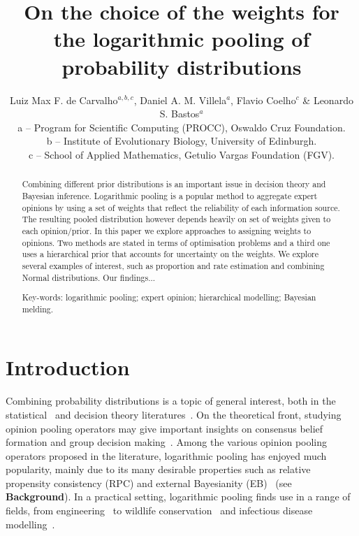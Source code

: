 \documentclass[a4paper, notitlepage, 10pt]{article}
\title{\vspace{-9ex}\centering \bf On the choice of the weights for the logarithmic pooling of probability distributions}
\author{
Luiz Max F. de Carvalho$^{a,b,c}$, Daniel A. M. Villela$^a$, Flavio Coelho$^c$ \& Leonardo S. Bastos$^a$ \\
a -- Program for Scientific Computing (PROCC), Oswaldo Cruz Foundation. \\
b -- Institute of Evolutionary Biology, University of Edinburgh.\\
c -- School of Applied Mathematics, Getulio Vargas Foundation (FGV).
}
\begin{document}
\maketitle

\begin{abstract}
Combining different prior distributions is an important issue in decision theory and Bayesian inference.
Logarithmic pooling is a popular method to aggregate expert opinions by using a set of weights that reflect the reliability of each information source.
The resulting pooled distribution however depends heavily on set of weights given to each opinion/prior.
In this paper we explore%
approaches to assigning weights to opinions.
Two methods are stated in terms of optimisation problems and a third one uses a hierarchical prior that accounts for uncertainty on the weights. 
We explore several examples of interest, such as proportion and rate estimation and combining Normal distributions.
Our findings...

Key-words: logarithmic pooling; expert opinion; hierarchical modelling; Bayesian melding. 
\end{abstract}

\section{Introduction}
\label{sec:intro}

Combining probability distributions is a topic of general interest, both in the statistical~\citep{west1984, genest1986A, genest1986B} and decision theory literatures~\citep{genest1984}.
On the theoretical front, studying opinion pooling operators may give important insights on consensus belief formation and group decision making~\citep{west1984,genest1986B}.
Among the various opinion pooling operators proposed in the literature, logarithmic pooling has enjoyed much popularity, mainly due to its many desirable properties such as relative propensity consistency (RPC) and external Bayesianity (EB)~\citep{genest1986A} (see \textbf{Background}). 
In a practical setting, logarithmic pooling finds use in a range of fields, from engineering~\citep{lind1988, savchuk1994} to wildlife conservation~\citep{poole2000} and infectious disease modelling~\citep{Coelho2009}. %
\end{document}
